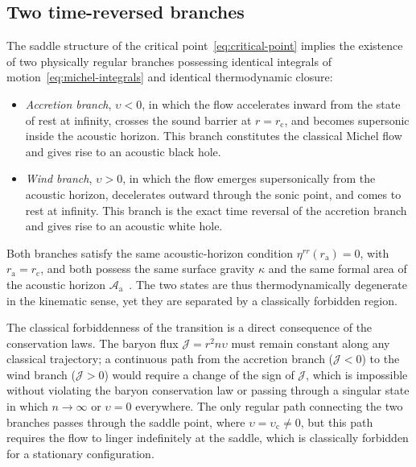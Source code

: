 \documentclass[12pt,a4paper,preprint]{elsarticle}
\begin{document}
        \subsection{Two time-reversed branches}\label{subsec:two-branches}
            The saddle structure of the critical point~\eqref{eq:critical-point} implies the existence of two physically regular branches possessing identical integrals of motion~\eqref{eq:michel-integrals} and identical thermodynamic closure:
            \begin{itemize}
                \item \emph{Accretion branch}, $\upsilon < 0$, in which the flow accelerates inward from the state of rest at infinity, crosses the sound barrier at $r = r_{\mathrm{c}}$, and becomes supersonic inside the acoustic horizon. This branch constitutes the classical Michel flow and gives rise to an acoustic black hole.
                \item \emph{Wind branch}, $\upsilon > 0$, in which the flow emerges supersonically from the acoustic horizon, decelerates outward through the sonic point, and comes to rest at infinity. This branch is the exact time reversal of the accretion branch and gives rise to an acoustic white hole.
            \end{itemize}
            Both branches satisfy the same acoustic-horizon condition $\eta^{rr}(r_{\mathrm{a}}) = 0$, with $r_{\mathrm{a}} = r_{\mathrm{c}}$, and both possess the same surface gravity $\kappa$ and the same formal area of the acoustic horizon $\mathcal{A}_{\mathrm{a}}$~\cite{SemyannikovAV_AcousticGeometryAndSoundRayDynamicsInRelativisticSphericalAccretion_2026}. The two states are thus thermodynamically degenerate in the kinematic sense, yet they are separated by a classically forbidden region.
            
            The classical forbiddenness of the transition is a direct consequence of the conservation laws. The baryon flux $\mathcal{J} = r^{2} n \upsilon$ must remain constant along any classical trajectory; a continuous path from the accretion branch ($\mathcal{J} < 0$) to the wind branch ($\mathcal{J} > 0$) would require a change of the sign of $\mathcal{J}$, which is impossible without violating the baryon conservation law or passing through a singular state in which $n \to \infty$ or $\upsilon = 0$ everywhere. The only regular path connecting the two branches passes through the saddle point, where $\upsilon = \upsilon_{\mathrm{c}} \neq 0$, but this path requires the flow to linger indefinitely at the saddle, which is classically forbidden for a stationary configuration.
            
\end{document}

